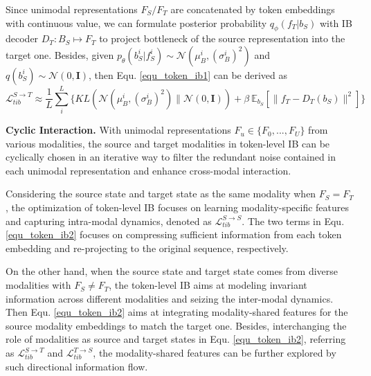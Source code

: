 \documentclass{article}
\begin{document}
Since unimodal representations $F_S/F_T$ are concatenated by token embeddings with continuous value, we can formulate posterior probability $q_\phi(f_T|b_S)$ with IB decoder $D_T:B_S\mapsto F_T$ to project bottleneck of the source representation into the target one. Besides, given $p_\theta(b^i_S|f^i_S)\sim\mathcal{N}(\mu^i_B, (\sigma_B^{i})^2)$ and $q(b^i_S)\sim\mathcal{N}(0,\textbf{I})$, then Equ. \ref{equ_token_ib1} can be derived as
\begin{equation}
    \mathcal{L}^{S\rightarrow T}_{tib} \approx \frac{1}{L}\sum^L_{i} \{KL( \mathcal{N}(\mu^i_B, (\sigma_B^{i})^2)\parallel\mathcal{N}(0,\textbf{I})) + \beta\ \mathbb{E}_{b_S} [\parallel f_T-D_T(b_S)\parallel^2] \}
\label{equ_token_ib2}
\end{equation}

\textbf{Cyclic Interaction.} With unimodal representations $F_u\in\{F_0,...,F_U\}$ from various modalities, the source and target modalities in token-level IB can be cyclically chosen in an iterative way to filter the redundant noise contained in each unimodal representation and enhance cross-modal interaction. 

Considering the source state and target state as the same modality when $F_S=F_T$, the optimization of token-level IB focuses on learning modality-specific features and capturing intra-modal dynamics, denoted as $\mathcal{L}^{S\rightarrow S}_{tib}$. The two terms in Equ. \ref{equ_token_ib2} focuses on compressing sufficient information from each token embedding and re-projecting to the original sequence, respectively. 

On the other hand, when the source state and target state comes from diverse modalities with $F_S\neq F_T$, the token-level IB aims at modeling invariant information across different modalities and seizing the inter-modal dynamics. Then Equ. \ref{equ_token_ib2} aims at integrating modality-shared features for the source modality embeddings to match the target one. Besides, interchanging the role of modalities as source and target states in Equ. \ref{equ_token_ib2}, referring as $\mathcal{L}^{S\rightarrow T}_{tib}$ and $\mathcal{L}^{T\rightarrow S}_{tib}$, the modality-shared features can be further explored by such directional information flow.

\end{document}
